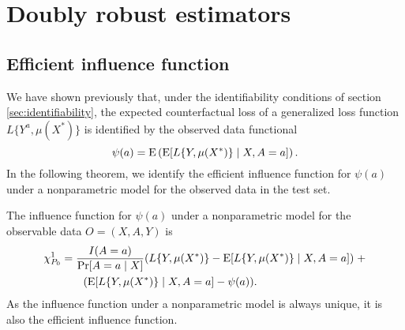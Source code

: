 

\section{Doubly robust estimators} \label{sec:dr}

\subsection{Efficient influence function}
We have shown previously that, under the identifiability conditions of section \ref{sec:identifiability}, the expected counterfactual loss of a generalized loss function $L\{Y^a, \mu(X^*)\}$ is identified by the observed data functional
\begin{equation*}\label{eqn:cl_estimand}
    \psi(a) = \operatorname{E}\left(\operatorname{E}[L\{Y, \mu(X^*)\} \mid X, A=a] \right).
\end{equation*}
In the following theorem, we identify the efficient influence function for $\psi(a)$ under a nonparametric model for the observed data in the test set. 

\begin{theorem}
    The influence function for $\psi(a)$ under a nonparametric model for the observable data $O = (X, A, Y)$ is 
\begin{align*}
    \chi_{P_0}^1 &= \frac{I(A = a)}{\Pr[A = a \mid X]}(L\{Y, \mu(X^*)\} - \operatorname{E}[L\{Y, \mu(X^*)\} \mid X, A=a])  \; + \\
    & \qquad (\operatorname{E}[L\{Y, \mu(X^*)\} \mid X, A=a] - \psi(a)).
\end{align*}
As the influence function under a nonparametric model is always unique, it is also the efficient influence function. 
\end{theorem}


